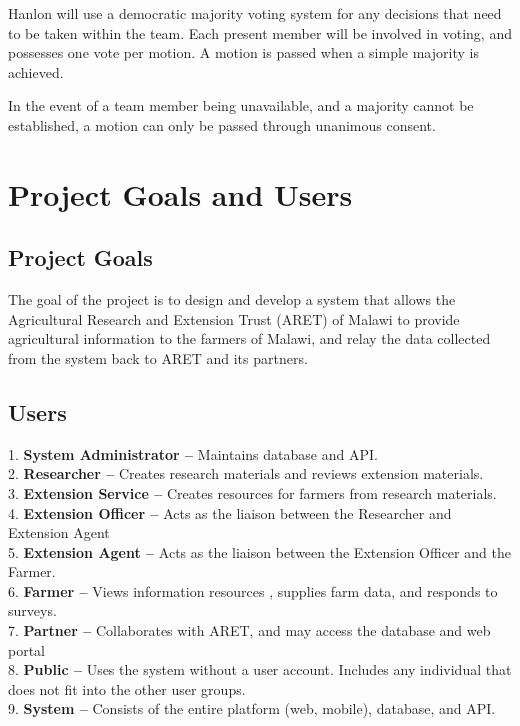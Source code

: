 \documentclass[12pt,letterpaper]{article}
\begin{document}
Hanlon will use a democratic majority voting system for any decisions that need to be taken within the team. Each present member will be involved in voting, and possesses one vote per motion. A motion is passed when a simple majority is achieved. \par

In the event of a team member being unavailable, and a majority cannot be established, a motion can only be passed through unanimous consent.

\clearpage
\section{Project Goals and Users}
\subsection{Project Goals}

The goal of the project is to design and develop a system that allows the Agricultural Research and Extension Trust (ARET) of Malawi to provide agricultural information to the farmers of Malawi, and relay the data collected from the system back to ARET and its partners.

\subsection{Users}
1.\hspace*{5pt} \textbf{System Administrator -- } Maintains database and API.\\
2.\hspace*{5pt} \textbf{Researcher -- } Creates research materials and reviews extension materials. \\
3.\hspace*{5pt} \textbf{Extension Service --} Creates resources for farmers from research materials. \\
4.\hspace*{5pt} \textbf{Extension Officer -- } Acts as the liaison between the Researcher and Extension Agent \\
5.\hspace*{5pt} \textbf{Extension Agent -- } Acts as the liaison between the Extension Officer and the Farmer. \\
6.\hspace*{5pt} \textbf{Farmer -- } Views information resources , supplies farm data, and responds to surveys. \\
7.\hspace*{5pt} \textbf{Partner -- } Collaborates with ARET, and may access the database and web portal \\
8.\hspace*{5pt} \textbf{Public -- } Uses the system without a user account. Includes any individual that does not fit into the other user groups. \\
9.\hspace*{5pt} \textbf{System -- } Consists of the entire platform (web, mobile), database, and API.
\end{document}
